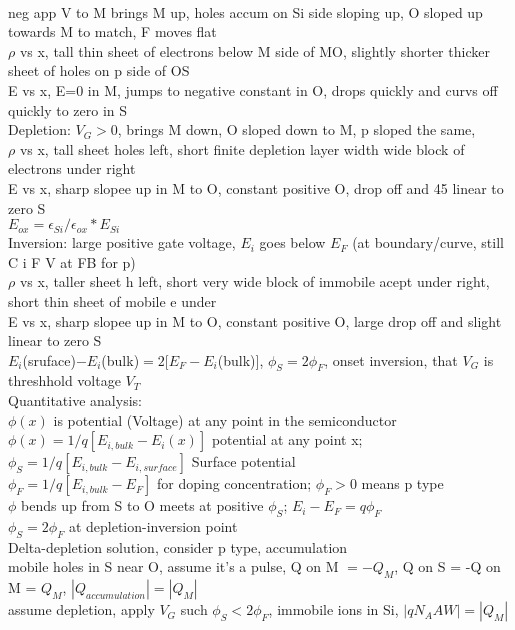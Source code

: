 \documentclass{article}
\begin{document}
\begin{large}
\\neg app V to M brings M up, holes accum on Si side sloping up, O sloped up towards M to match, F moves flat
\\$\rho$ vs x, tall thin sheet of electrons below M side of MO, slightly shorter thicker sheet of holes on p side of OS
\\E vs x, E=0 in M, jumps to negative constant in O, drops quickly and curvs off quickly to zero in S
\\Depletion: $V_G>0$, brings M down, O sloped down to M, p sloped the same, 
\\$\rho$ vs x, tall sheet holes left, short finite depletion layer width wide block of electrons under right
\\E vs x, sharp slopee up in M to O, constant positive O, drop off and 45 linear to zero S
\\$E_{ox}=\epsilon_{Si}/\epsilon_{ox}*E_{Si}$
\\Inversion: large positive gate voltage, $E_i$ goes below $E_F$ (at boundary/curve, still C i F V at FB for p)
\\$\rho$ vs x, taller sheet h left, short very wide block of immobile acept under right, short thin sheet of mobile e under
\\E vs x, sharp slopee up in M to O, constant positive O, large drop off and slight linear to zero S
\\$E_i$(sruface)$-E_i$(bulk)$=2[E_F-E_i$(bulk)$]$, $\phi_S=2\phi_F$, onset inversion, that $V_G$ is threshhold voltage $V_T$
\\Quantitative analysis:
\\$\phi(x)$ is potential (Voltage) at any point in the semiconductor
\\$\phi(x)=1/q[E_{i,bulk}-E_i(x)]$ potential at any point x; $\phi_S=1/q[E_{i,bulk}-E_{i,surface}]$ Surface potential
\\$\phi_F=1/q[E_{i,bulk}-E_F]$ for doping concentration; $\phi_F>0$ means p type
\\$\phi$ bends up from S to O meets at positive $\phi_S$; $E_i-E_F=q\phi_F$
\\$\phi_S=2\phi_F$ at depletion-inversion point
\\Delta-depletion solution, consider p type, accumulation
\\mobile holes in S near O, assume it's a pulse, Q on M $= -Q_M$, Q on S = -Q on M = $Q_M$, $|Q_{accumulation}|=|Q_M|$
\\assume depletion, apply $V_G$ such $\phi_S<2\phi_F$, immobile ions in Si, $|q N_A A W|=|Q_M|$

\end{large}
\end{document}
